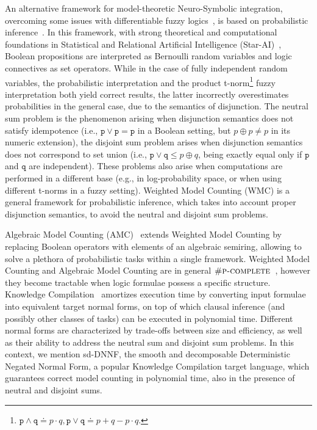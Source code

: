 An alternative framework for model-theoretic Neuro-Symbolic integration, overcoming some issues with differentiable fuzzy logics~\cite{van2022analyzing}, is based on probabilistic inference~\cite{xu2018semantic, manhaeve2018deepproblog, winters2022deepstochlog}. In this framework, with strong theoretical and computational foundations in Statistical and Relational Artificial Intelligence (Star-AI)~\cite{raedt2016statistical}, Boolean propositions are interpreted as Bernoulli random variables and logic connectives as set operators.
While in the case of fully independent random variables, the probabilistic interpretation and the product t-norm\footnote{$\texttt{p} \wedge \texttt{q} \doteq p \cdot q, \texttt{p} \vee \texttt{q} \doteq p + q - p \cdot q$.} fuzzy interpretation both yield correct results, the latter incorrectly overestimates probabilities in the general case, due to the semantics of disjunction. The neutral sum problem is the phenomenon arising when disjunction semantics does not satisfy idempotence (i.e., $\texttt{p} \vee \texttt{p} = \texttt{p}$ in a Boolean setting, but $p \oplus p \not = p$ in its numeric extension), the disjoint sum problem arises when disjunction semantics does not correspond to set union (i.e., $\texttt{p} \vee \texttt{q} \leq p \oplus q$, being exactly equal only if $\texttt{p}$ and $\texttt{q}$ are independent). These problems also arise when computations are performed in a different base (e.g., in log-probability space, or when using different t-norms in a fuzzy setting). 
Weighted Model Counting (WMC) is a general framework for probabilistic inference, which takes into account proper disjunction semantics, to avoid the neutral and disjoint sum problems. %

Algebraic Model Counting (AMC)~\cite{kimmig2017algebraic} extends Weighted Model Counting by replacing Boolean operators with elements of an algebraic semiring, allowing to solve a plethora of probabilistic tasks within a single framework. Weighted Model Counting and Algebraic Model Counting are in general $\textsc{\#p-complete}$~\cite{chavira2008probabilistic}, however they become tractable when logic formulae possess a specific structure. Knowledge Compilation~\cite{darwiche2002knowledge} amortizes execution time by converting input formulae into equivalent target normal forms, on top of which clausal inference (and possibly other classes of tasks) can be executed in polynomial time. Different normal forms are characterized by trade-offs between size and efficiency, as well as their ability to address the neutral sum and disjoint sum problems. 
In this context, we mention sd-DNNF, the smooth and decomposable Deterministic Negated Normal Form, a popular Knowledge Compilation target language, which guarantees correct model counting in polynomial time, also in the presence of neutral and disjoint sums.


